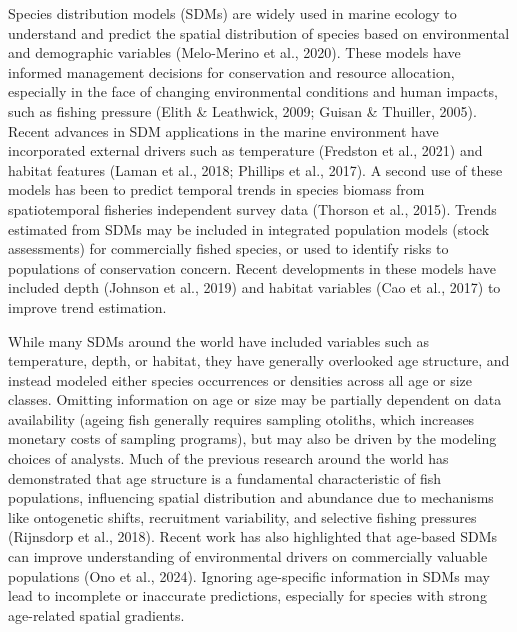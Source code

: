 \documentclass[
]{article}
\begin{document}
Species distribution models (SDMs) are widely used in marine ecology to
understand and predict the spatial distribution of species based on
environmental and demographic variables (Melo-Merino et al., 2020).
These models have informed management decisions for conservation and
resource allocation, especially in the face of changing environmental
conditions and human impacts, such as fishing pressure (Elith \&
Leathwick, 2009; Guisan \& Thuiller, 2005). Recent advances in SDM
applications in the marine environment have incorporated external
drivers such as temperature (Fredston et al., 2021) and habitat features
(Laman et al., 2018; Phillips et al., 2017). A second use of these
models has been to predict temporal trends in species biomass from
spatiotemporal fisheries independent survey data (Thorson et al., 2015).
Trends estimated from SDMs may be included in integrated population
models (stock assessments) for commercially fished species, or used to
identify risks to populations of conservation concern. Recent
developments in these models have included depth (Johnson et al., 2019)
and habitat variables (Cao et al., 2017) to improve trend estimation.

While many SDMs around the world have included variables such as
temperature, depth, or habitat, they have generally overlooked age
structure, and instead modeled either species occurrences or densities
across all age or size classes. Omitting information on age or size may
be partially dependent on data availability (ageing fish generally
requires sampling otoliths, which increases monetary costs of sampling
programs), but may also be driven by the modeling choices of analysts.
Much of the previous research around the world has demonstrated that age
structure is a fundamental characteristic of fish populations,
influencing spatial distribution and abundance due to mechanisms like
ontogenetic shifts, recruitment variability, and selective fishing
pressures (Rijnsdorp et al., 2018). Recent work has also highlighted
that age-based SDMs can improve understanding of environmental drivers
on commercially valuable populations (Ono et al., 2024). Ignoring
age-specific information in SDMs may lead to incomplete or inaccurate
predictions, especially for species with strong age-related spatial
gradients.
\end{document}
